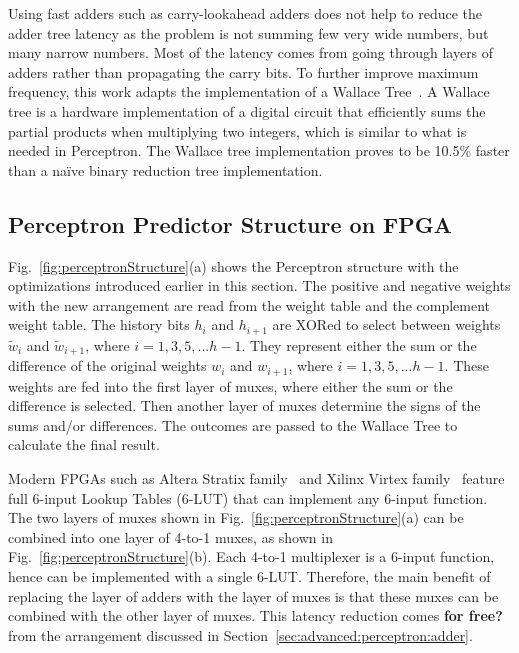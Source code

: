 Using fast adders such as carry-lookahead adders does not help to reduce the adder tree latency as the problem is not summing few very wide numbers, but many narrow numbers. Most of the latency comes from going through layers of adders rather than propagating the carry bits. To further improve maximum frequency, this work adapts the implementation of a Wallace Tree~\cite{wallacetree}. A Wallace tree is a hardware implementation of a digital circuit that efficiently sums the partial products when multiplying two integers, which is similar to what  is needed in Perceptron. The Wallace tree implementation proves to be 10.5\% faster than a na\"ive binary reduction tree implementation. 

\subsection{Perceptron Predictor Structure on FPGA}
\label{sec:advanced:perceptron:structure}
Fig.~\ref{fig:perceptronStructure}(a) shows the Perceptron structure with the optimizations introduced earlier in this section. The positive and negative weights with the new arrangement are read from the weight table and the complement weight table. The history bits $h_i$ and $h_{i+1}$ are XORed to select between weights $\widetilde{w}_i$ and $\widetilde{w}_{i+1}$, where $i = 1,3,5,...h-1$. They represent either the sum or the difference of the original weights $w_i$ and $w_{i+1}$, where $i = 1,3,5,...h-1$. These weights are fed into the first layer of muxes, where either the sum or the difference is selected. Then another layer of muxes determine the signs of the sums and/or differences. The outcomes are passed to the Wallace Tree to calculate the final result.

Modern FPGAs such as Altera Stratix family~\cite{StratixIV} and Xilinx Virtex family~\cite{virtex} feature full 6-input Lookup Tables (6-LUT) that can implement any 6-input function. The two layers of muxes shown in Fig.~\ref{fig:perceptronStructure}(a) can be combined into one layer of 4-to-1 muxes, as shown in Fig.~\ref{fig:perceptronStructure}(b). Each 4-to-1 multiplexer is a 6-input function, hence can be implemented with a single 6-LUT. Therefore, the main benefit of replacing the layer of adders with the layer of muxes is that these muxes can be combined with the other layer of muxes. This latency reduction comes \textbf{\textbf{for} free?} from the arrangement discussed in Section~\ref{sec:advanced:perceptron:adder}.


